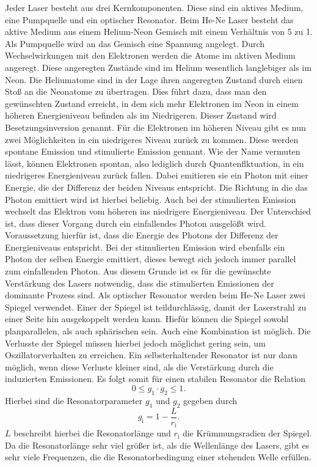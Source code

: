 Jeder Laser besteht aus drei Kernkomponenten. Diese sind ein aktives Medium, eine Pumpquelle und ein optischer Resonator. Beim He-Ne Laser besteht das aktive Medium
aus einem Helium-Neon Gemisch mit einem Verhältnis von 5 zu 1. Als Pumpquelle wird an das Gemisch eine Spannung angelegt. Durch Wechselwirkungen mit den Elektronen werden
die Atome im aktiven Medium angeregt. Diese angeregten Zustände sind im Helium wesentlich langlebiger als im Neon. Die Heliumatome sind in der Lage ihren angeregten Zustand
durch einen Stoß an die Neonatome zu übertragen. Dies führt dazu, dass man den gewünschten Zustand erreicht, in dem sich mehr Elektronen im Neon in einem höheren Energieniveau
befinden als im Niedrigeren. Dieser Zustand wird Besetzungsinversion genannt.
\newline
Für die Elektronen im höheren Niveau gibt es nun zwei Möglichkeiten in ein niedrigeres Niveau zurück zu kommen. Diese werden spontane Emission und stimulierte Emission gennant.
Wie der Name vermuten lässt, können Elektronen spontan, also lediglich durch Quantenflktuation, in ein niedrigeres Energieniveau zurück fallen.
Dabei emitieren sie ein Photon mit einer Energie, die der Differenz der beiden Niveaus entspricht. Die Richtung in die das Photon emittiert wird ist hierbei beliebig.
\newline
Auch bei der stimulierten Emission wechselt das Elektron vom höheren ins niedrigere Energieniveau. Der Unterschied ist, dass dieser Vorgang durch ein einfallendes Photon ausgelößt
wird. Voraussetzung hierfür ist, dass die Energie des Photons der Differenz der Energieniveaus entspricht. Bei der stimulierten Emission wird ebenfalls ein Photon der selben Energie
emittiert, dieses bewegt sich jedoch immer parallel zum einfallenden Photon. Aus diesem Grunde ist es für die gewünschte Verstärkung des Lasers notwendig, dass die stimulierten
Emissionen der dominante Prozess sind.
\newline
\newline
Als optischer Resonator werden beim He-Ne Laser zwei Spiegel verwendet. Einer der Spiegel ist teildurchlässig, damit der Laserstrahl zu einer Seite hin ausgekoppelt werden kann.
Hiefür können die Spiegel sowohl planparallelen, als auch sphärischen sein. Auch eine Kombination ist möglich. Die Verlusste der Spiegel müssen hierbei jedoch möglichst gering sein,
um Oszillatorverhalten zu erreichen. Ein selbsterhaltender Resonator ist nur dann möglich, wenn diese Verluste kleiner sind, als die Verstärkung durch die induzierten Emissionen.
Es folgt somit für einen stabilen Resonator die Relation
\begin{equation}
    0 \leq g_1 \cdot g_2 \leq 1.
\end{equation}
\noindent
Hierbei sind die Resonatorparameter $g_1$ und $g_2$ gegeben durch
\begin{equation}
    g_\text{i} = 1 - \frac{L}{r_\text{i}}.
\end{equation}
\noindent
$L$ beschreibt hierbei die Resonatorlänge und $r_\text{i}$ die Krümmungsradien der Spiegel. Da die Resonatorlänge sehr viel größer ist, als die Wellenlänge des Lasers,
gibt es sehr viele Frequenzen, die die Resonatorbedingung einer stehenden Welle erfüllen.



